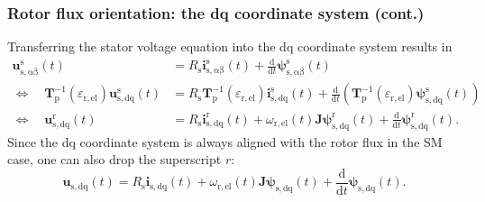 \begin{frame}
	\frametitle{Rotor flux orientation: the dq coordinate system (cont.) }
	Transferring the stator voltage equation into the dq coordinate system results in
		   \begin{equation}
			\begin{split}
			\bm{u}^\mathrm{s}_\mathrm{s,\alpha\beta}(t) &= R_\mathrm{s} \bm{i}^\mathrm{s}_\mathrm{s,\alpha\beta}(t)+ \frac{\mathrm{d}}{\mathrm{d}t}\bm{\psi}^\mathrm{s}_\mathrm{s,\alpha\beta}(t)\\
			\Leftrightarrow \quad \bm{T}^{-1}_\mathrm{p}(\varepsilon_\mathrm{r,el})\bm{u}^\mathrm{s}_\mathrm{s,dq}(t) &= R_\mathrm{s} \bm{T}^{-1}_\mathrm{p}(\varepsilon_\mathrm{r,el})\bm{i}^\mathrm{s}_\mathrm{s,dq}(t)+ \frac{\mathrm{d}}{\mathrm{d}t}(\bm{T}^{-1}_\mathrm{p}(\varepsilon_\mathrm{r,el})\bm{\psi}^\mathrm{s}_\mathrm{s,dq}(t))\\
			\Leftrightarrow \quad \bm{u}^\mathrm{r}_\mathrm{s,dq}(t) &= R_\mathrm{s} \bm{i}^\mathrm{r}_\mathrm{s,dq}(t)+ \omega_\mathrm{r,el}(t)\bm{J}\bm{\psi}^\mathrm{r}_\mathrm{s,dq}(t) + \frac{\mathrm{d}}{\mathrm{d}t}\bm{\psi}^\mathrm{r}_\mathrm{s,dq}(t).
		\end{split}
		\end{equation}
	Since the dq coordinate system is always aligned with the rotor flux in the SM case, one can also drop the superscript $r$:
	\begin{equation*}
		\bm{u}_\mathrm{s,dq}(t) = R_\mathrm{s} \bm{i}_\mathrm{s,dq}(t)+ \omega_\mathrm{r,el}(t)\bm{J}\bm{\psi}_\mathrm{s,dq}(t) + \frac{\mathrm{d}}{\mathrm{d}t}\bm{\psi}_\mathrm{s,dq}(t).
	\end{equation*} 
\end{frame}


